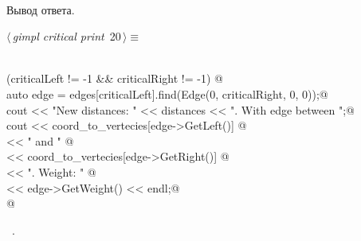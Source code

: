 \documentclass[12pt]{article}
\begin{document}
\paragraph{}
Вывод ответа.
\begin{flushleft} \small
\begin{minipage}{\linewidth}\label{scrap33}\raggedright\small
{} $\langle\,${\itshape gimpl critical print}\nobreak\ {\footnotesize {20}}$\,\rangle\equiv$
\vspace{-1ex}
\begin{list}{}{} \item
\mbox{}\verb@@\\
\mbox{}\verb@if (criticalLeft != -1 && criticalRight != -1) {@\\
\mbox{}\verb@    auto edge = edges[criticalLeft].find(Edge(0, criticalRight, 0, 0));@\\
\mbox{}\verb@    cout << "New distances: " << distances << ". With edge between ";@\\
\mbox{}\verb@    cout << coord_to_vertecies[edge->GetLeft()] @\\
\mbox{}\verb@      << " and " @\\
\mbox{}\verb@      << coord_to_vertecies[edge->GetRight()] @\\
\mbox{}\verb@      << ". Weight: " @\\
\mbox{}\verb@      << edge->GetWeight() << endl;@\\
\mbox{}\verb@} @\\
\mbox{}\verb@@{\NWsep}
\end{list}
\vspace{-1.5ex}
\footnotesize
\begin{list}{}{\setlength{\itemsep}{-\parsep}\setlength{\itemindent}{-\leftmargin}}
\item \NWtxtMacroRefIn\ .

\item{}
\end{list}
\end{minipage}\vspace{4ex}
\end{flushleft}
\end{document}
